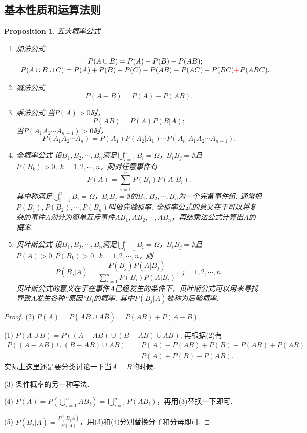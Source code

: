 \documentclass{article}
\newtheorem{proposition}[theorem]{Proposition}
\begin{document}
\newpage
\subsection{基本性质和运算法则}


\begin{proposition}
\rm 五大概率公式
\begin{enumerate}
	\item {\color{red}加法公式} 
	$$
	\begin{array}{c}
	P(A \cup B) = P(A) + P(B) - P(AB);\\
	P(A \cup B \cup C) = P(A) + P(B) +P(C) -P(AB) - P(AC) -P(BC) {\color{red}+}P(ABC).
	\end{array}
	$$
	\item {\color{red}减法公式} 
	$$
	P(A - B) = P(A) - P(AB).
	$$
	\item {\color{red}乘法公式} 当$P(A) > 0$时，
	$$
	P(AB) = P(A)P(B|A);
	$$
	当$P(A_1A_2\cdots A_{n-1}) > 0$时，
	$$
	P(A_1A_2\cdots A_n) = P(A_1)P(A_2|A_1)\cdots P(A_n|A_1A_2\cdots A_{n-1}).
	$$
	\item {\color{red}全概率公式} 设$B_1,B_2,\cdots,B_n$满足$\bigcup\limits_{i=1}^n B_i = \Omega$，$B_iB_j = \emptyset$且$P(B_k) > 0,\; k=1,2,\cdots,n$，则对任意事件有
	$$
		P(A) = \sum\limits_{i=1}^n P(B_i)P(A|B_i).
	$$
	其中称满足$\bigcup\limits_{i=1}^n B_i = \Omega$，$B_iB_j = \emptyset$的$B_1,B_2,\cdots,B_n$为一个{\color{red}完备事件组}. 通常把$P(B_1), P(B_2),\cdots,P(B_n)$叫做{\color{red}先验概率}. {\color{blue}全概率公式的意义在于可以将复杂的事件$A$划分为简单互斥事件$AB_1,AB_2,\cdots,AB_n$，再结乘法公式计算出$A$的概率}.
	\item {\color{red}贝叶斯公式} 设$B_1,B_2,\cdots,B_n$满足$\bigcup\limits_{i=1}^n B_i = \Omega$，$B_iB_j = \emptyset$且$P(A)>0, P(B_k) > 0,\; k=1,2,\cdots,n$，则
	$$
		P(B_j | A) = \frac{P(B_j)P(A|B_j)}{\sum\limits_{i=1}^n P(B_i)P(A|B_i)},\; j = 1,2,\cdots,n.
	$$
	贝叶斯公式的意义在于{\color{blue}在事件$A$已经发生的条件下，贝叶斯公式可以用来寻找导致$A$发生各种“原因”$B_i$的概率}. 其中$P(B_j|A)$被称为{\color{red}后验概率}.
\end{enumerate}
\end{proposition}

\begin{proof}
(2) $P(A) = P(AB \cup A\bar{B}) = P(AB)+P(A-B).$

(1) $P(A \cup B) = P((A-AB) \cup (B-AB) \cup AB)$, 再根据(2)有
$$
\begin{array}{ll}
P((A-AB) \cup (B-AB) \cup AB) &= P(A)-P(AB) + P(B) - P(AB) + P(AB) \\
&= P(A) + P(B) -P(AB).
\end{array}
$$
{\color{blue} 实际上这里还是要分类讨论一下当$A=B$的时候.}

(3) 条件概率的另一种写法.

(4) $P(A) = P(\bigcup\limits_{i=1}^n AB_i) = \bigcup\limits_{i=1}^n P(AB_i)$，再用(3)替换一下即可.

(5) $P(B_j | A) =  \frac{P(B_jA)}{P(A)}$，用(3)和(4)分别替换分子和分母即可.
\end{proof}
\end{document}

